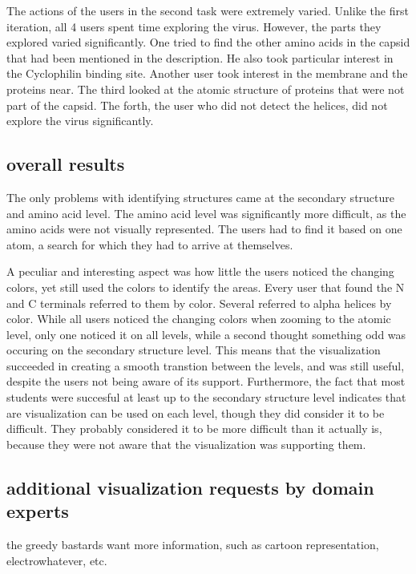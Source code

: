 \documentclass[review,journal]{vgtc}         %
\begin{document}
The actions of the users in the second task were extremely varied. Unlike the first iteration, all 4 users spent time exploring the virus. However, the parts they explored varied significantly. One tried to find the other amino acids in the capsid that had been mentioned in the description. He also took particular interest in the Cyclophilin binding site. Another user took interest in the membrane and the proteins near. The third looked at the atomic structure of proteins that were not part of the capsid. The forth, the user who did not detect the helices, did not explore the virus significantly.



\subsection{overall results}
The only problems with identifying structures came at the secondary structure and amino acid level. The amino acid level was significantly more difficult, as the amino acids were not visually represented. The users had to find it based on one atom, a search for which they had to arrive at themselves. 

A peculiar and interesting aspect was how little the users noticed the changing colors, yet still used the colors to identify the areas. Every user that found the N and C terminals referred to them by color. Several referred to alpha helices by color. While all users noticed the changing colors when zooming to the atomic level, only one noticed it on all levels, while a second thought something odd was occuring on the secondary structure level. This means that the visualization succeeded in creating a smooth transtion between the levels, and was still useful, despite the users not being aware of its support. Furthermore, the fact that most students were succesful at least up to the secondary structure level indicates that are visualization can be used on each level, though they did consider it to be difficult. They probably considered it to be more difficult than it actually is, because they were not aware that the visualization was supporting them.


\subsection{additional visualization requests by domain experts}
the greedy bastards want more information, such as cartoon representation, electrowhatever, etc.
\end{document}
